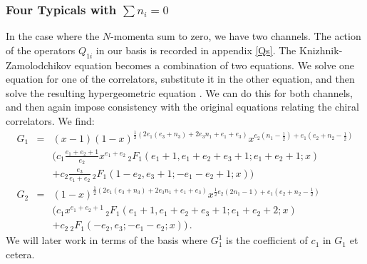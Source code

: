 \documentclass[12pt]{article}
\numberwithin{equation}{section}
\numberwithin{equation}{section}
\numberwithin{table}{section}\setlength{\multlinegap}{25pt}
\begin{document}
\subsubsection{Four Typicals  with $\sum n_i=0$}
In the case where the $N$-momenta sum to zero, 
we have two channels. The action of the operators $Q_{1 i}$ in our basis is
recorded in appendix \ref{Qs}.
The Knizhnik-Zamolodchikov equation becomes a  combination of two equations. We solve one equation for one of the correlators,
substitute it in the other equation, and then solve the resulting hypergeometric equation \cite{Rozansky:1992rx}.
 We can do this for both channels, and then again impose consistency with the original
equations relating the chiral correlators.  We find:
\begin{eqnarray}
G_1 &=& (x-1) (1-x)^{\frac{1}{2} \left(2 e_1 \left(e_3+n_3\right)+2 e_3 n_1+e_1+e_3\right)} x^{e_2 \left(n_1-\frac{1}{2}\right)+e_1 \left(e_2+n_2-\frac{1}{2}\right)} \nonumber 
\\
& & \Big(c_1 
\frac{e_1+e_2+1}{e_2}  x^{e_1+e_2} \, _2F_1\left(e_1+1,e_1+e_2+e_3+1;e_1+e_2+1;x\right) \nonumber
 \\
& & +c_2 \frac{ e_3}{e_1+e_2} \, _2F_1\left(1-e_2,e_3+1;-e_1-e_2+1;x\right) \Big)
\\
G_2 &=& (1-x)^{\frac{1}{2} \left(2 e_1 \left(e_3+n_3\right)+2 e_3 n_1+e_1+e_3\right)} x^{\frac{1}{2} e_2 \left(2 n_1-1\right)+e_1 \left(e_2+n_2-\frac{1}{2}\right)} 
\nonumber \\
& & \Big( c_1 x^{e_1+e_2+1} \,
   _2F_1\left(e_1+1,e_1+e_2+e_3+1;e_1+e_2+2;x\right)
\nonumber \\
& & 
+c_2 \, _2F_1\left(-e_2,e_3;-e_1-e_2;x\right) \Big)  \, . \nonumber 
\end{eqnarray}
 We will later work in terms of the basis where $G_1^1$ is the coefficient of $c_1$ in $G_1$ et cetera.
\end{document}
